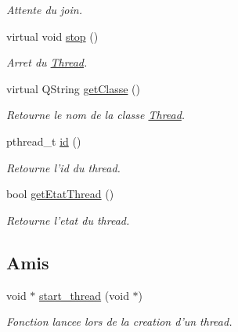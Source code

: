 \begin{DoxyCompactItemize}
\begin{DoxyCompactList}\small\item\em Attente du join. \item\end{DoxyCompactList}\item 
\hypertarget{classThread_abd50159ecd409936f454c2321f673616}{
virtual void \hyperlink{classThread_abd50159ecd409936f454c2321f673616}{stop} ()}
\label{classThread_abd50159ecd409936f454c2321f673616}

\begin{DoxyCompactList}\small\item\em Arret du \hyperlink{classThread}{Thread}. \item\end{DoxyCompactList}\item 
virtual QString \hyperlink{classThread_ad055e7c603fda2607670f69c32b2d98a}{getClasse} ()
\begin{DoxyCompactList}\small\item\em Retourne le nom de la classe \hyperlink{classThread}{Thread}. \item\end{DoxyCompactList}\item 
pthread\_\-t \hyperlink{classThread_a2bcb649ad0f9304744c18e5c15d7fa8e}{id} ()
\begin{DoxyCompactList}\small\item\em Retourne l'id du thread. \item\end{DoxyCompactList}\item 
bool \hyperlink{classThread_a06a3cea9c644b36becc3dc21444d9f99}{getEtatThread} ()
\begin{DoxyCompactList}\small\item\em Retourne l'etat du thread. \item\end{DoxyCompactList}\end{DoxyCompactItemize}
\subsection*{Amis}
\begin{DoxyCompactItemize}
\item 
\hypertarget{classThread_ab6e610ca1cdc02783d947d3341c17ddf}{
void $\ast$ \hyperlink{classThread_ab6e610ca1cdc02783d947d3341c17ddf}{start\_\-thread} (void $\ast$)}
\label{classThread_ab6e610ca1cdc02783d947d3341c17ddf}

\begin{DoxyCompactList}\small\item\em Fonction lancee lors de la creation d'un thread. \item\end{DoxyCompactList}\end{DoxyCompactItemize}


